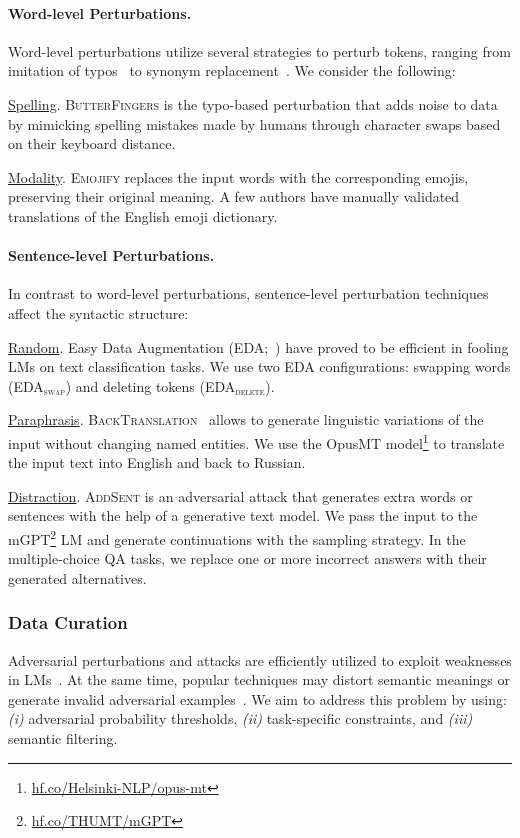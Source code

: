 \documentclass[11pt]{article}
\begin{document}
\paragraph{Word-level Perturbations.} Word-level perturbations utilize several strategies to perturb tokens, ranging from imitation of typos~\cite{jin2020bert} to synonym replacement~\cite{wei-zou-2019-eda}. We consider the following:

\noindent \underline{Spelling}. \textsc{ButterFingers} is the typo-based perturbation that adds noise to data by mimicking spelling mistakes made by humans through character swaps based on their keyboard distance.

\noindent\underline{Modality}. \textsc{Emojify} replaces the input words with the corresponding emojis, preserving their original meaning. A few authors have manually validated translations of the English emoji dictionary.

\paragraph{Sentence-level Perturbations.} In contrast to word-level perturbations, sentence-level perturbation techniques affect the syntactic structure:

\noindent\underline{Random}. Easy Data Augmentation (\textsc{EDA};~\citealp{wei-zou-2019-eda}) have proved to be efficient in fooling LMs on text classification tasks. We use two \textsc{EDA} configurations: swapping words (\textsc{EDA$_\text{swap}$}) and deleting tokens (\textsc{EDA$_\text{delete}$}).
    
\noindent\underline{Paraphrasis}. \textsc{BackTranslation}~\cite{yaseen-and-langer-backtranslation-ner} allows to generate linguistic variations of the input without changing named entities. We use the OpusMT model\footnote{\href{https://huggingface.co/Helsinki-NLP}{hf.co/Helsinki-NLP/opus-mt}} to translate the input text into English and back to Russian.

\noindent\underline{Distraction}. \textsc{AddSent} is an adversarial attack that generates extra words or sentences with the help of a generative text model. We pass the input to the mGPT\footnote{\href{https://huggingface.co/THUMT/mGPT}{hf.co/THUMT/mGPT}} LM and generate continuations with the sampling strategy. In the multiple-choice QA tasks, we replace one or more incorrect answers with their generated alternatives.

\subsubsection{Data Curation}
Adversarial perturbations and attacks are efficiently utilized to exploit weaknesses in LMs~\cite{goel-etal-2021-robustness}. At the same time, popular techniques may distort semantic meanings or generate invalid adversarial examples~\cite{wang2021adversarial}. We aim to address this problem by using: \emph{(i)} adversarial probability thresholds, \emph{(ii)} task-specific constraints, and \emph{(iii)} semantic filtering.
\end{document}
